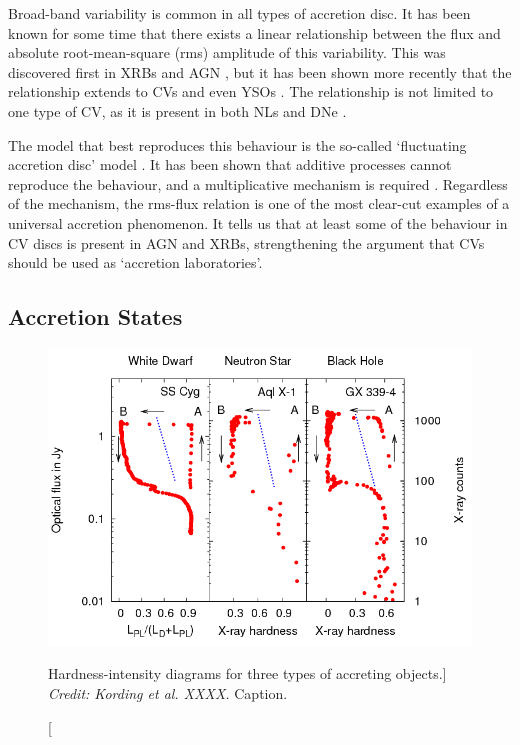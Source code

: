 Broad-band variability is common in all types of accretion disc. It has been
known for some time that there exists a linear relationship
between the flux and absolute root-mean-square (rms) amplitude
of this variability. This was discovered first in XRBs and AGN 
\citep{uttley2001, uttley2005, heil2012}, but it has been shown
more recently that the relationship extends to CVs and even YSOs 
\citep{scaringi2012,scaringi2015a}. The relationship is not limited
to one type of CV, as it is present in both NLs and DNe \citep{vandesande2015}.
 
The model that best reproduces this behaviour is the so-called
`fluctuating accretion disc' model \citep{lyubarskii1997,kotov2001,
arevalo2006,hogg2015}. It has been shown that 
additive processes cannot reproduce the behaviour, and a multiplicative
mechanism is required \citep{uttley2005}. 
Regardless of the mechanism, the rms-flux relation is one of the most
clear-cut examples of a universal accretion phenomenon. 
It tells us that at least some of the behaviour in CV discs
is present in AGN and XRBs, strengthening the argument that CVs
should be used as `accretion laboratories'. 


\subsection{Accretion States}


\begin{figure}
\centering
\includegraphics[width=1.0\textwidth]{figures/01-intro/kording_hid.png}
\caption
[Hardness-intensity diagrams for three types of accreting objects.]
{
{\sl Credit: Kording et al. XXXX.} 
Caption.
} 
\label{fig:kording_hid}
\end{figure}



